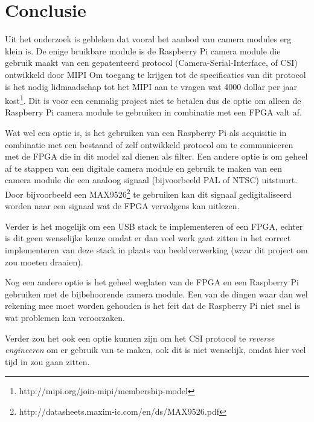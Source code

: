 \chapter{Conclusie}

Uit het onderzoek is gebleken dat vooral het aanbod van camera modules erg klein
is. De enige bruikbare module is de Raspberry Pi camera module die gebruik maakt
van een gepatenteerd protocol (Camera-Serial-Interface, of CSI) ontwikkeld door
MIPI Om toegang te krijgen tot de specificaties van dit protocol is het nodig
lidmaadschap tot het MIPI aan te vragen wat 4000 dollar per jaar
kost\footnote{http://mipi.org/join-mipi/membership-model}. Dit is voor een
eenmalig project niet te betalen dus de optie om alleen de Raspberry Pi camera
module te gebruiken in combinatie met een FPGA valt af.

Wat wel een optie is, is het gebruiken van een Raspberry Pi als acquisitie in
combinatie met een bestaand of zelf ontwikkeld protocol om te communiceren met
de FPGA die in dit model zal dienen als filter. Een andere optie is om geheel
af te stappen van een digitale camera module en gebruik te maken van een camera
module die een analoog signaal (bijvoorbeeld PAL of NTSC) uitstuurt. Door
bijvoorbeeld een MAX9526\footnote{http://datasheets.maxim-ic.com/en/ds/MAX9526.pdf}
te gebruiken kan dit signaal gedigitaliseerd worden naar een signaal wat de FPGA
vervolgens kan uitlezen.

Verder is het mogelijk om een USB stack te implementeren of een FPGA, echter is
dit geen wenselijke keuze omdat er dan veel werk gaat zitten in het correct
implementeren van deze stack in plaats van beeldverwerking (waar dit project om
zou moeten draaien).

Nog een andere optie is het geheel weglaten van de FPGA en een Raspberry Pi
gebruiken met de bijbehoorende camera module. Een van de dingen waar dan wel
rekening mee moet worden gehouden is het feit dat de Raspberry Pi niet snel is
wat problemen kan veroorzaken.

Verder zou het ook een optie kunnen zijn om het CSI protocol te \emph{reverse
engineeren} om er gebruik van te maken, ook dit is niet wenselijk, omdat hier
veel tijd in zou gaan zitten.
